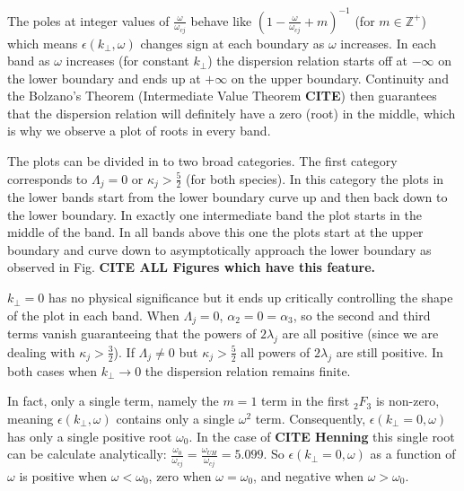 \documentclass[12pt,a4paper]{article}
\begin{document}
    The poles at integer values of $\frac{\omega}{\omega_{cj}}$ behave like $(1 - \frac{\omega}{\omega_{cj}} + m)^{-1}$ (for $m \in \mathbb{Z}^+$) which means $\epsilon(k_\perp, \omega)$ changes sign at each boundary as $\omega$ increases.
    In each band as $\omega$ increases (for constant $k_\perp$) the dispersion relation starts off at $-\infty$ on the lower boundary and ends up at $+\infty$ on the upper boundary.
    Continuity and the Bolzano's Theorem (Intermediate Value Theorem \textbf{CITE}) then guarantees that the dispersion relation will definitely have a zero (root) in the middle, which is why we observe a plot of roots in every band.

    The plots can be divided in to two broad categories.
    The first category corresponds to $\Lambda_j = 0$ or $\kappa_j > \frac{5}{2}$ (for both species).
    In this category the plots in the lower bands start from the lower boundary curve up and then back down to the lower boundary.
    In exactly one intermediate band the plot starts in the middle of the band.
    In all bands above this one the plots start at the upper boundary and curve down to asymptotically approach the lower boundary as observed in Fig. \textbf{CITE ALL Figures which have this feature.}

    $k_\perp = 0$ has no physical significance but it ends up critically controlling the shape of the plot in each band.
    When $\Lambda_j = 0$, $\alpha_2 = 0 = \alpha_3$, so the second and third terms vanish guaranteeing that the powers of $2 \lambda_j$ are all positive (since we are dealing with $\kappa_j > \frac{3}{2}$).
    If $\Lambda_j \neq 0$ but $\kappa_j > \frac{5}{2}$ all powers of $2 \lambda_j$ are still positive.
    In both cases when $k_\perp \rightarrow 0$ the dispersion relation remains finite.

    In fact, only a single term, namely the $m = 1$ term in the first $_2F_3$ is non-zero, meaning $\epsilon(k_\perp, \omega)$ contains only a single $\omega^2$ term.
    Consequently, $\epsilon(k_\perp = 0, \omega)$ has only a single positive root $\omega_0$.
    In the case of \textbf{CITE Henning} this single root can be calculate analytically: $\frac{\omega_0}{\omega_{cj}} = \frac{\omega_{UH}}{\omega_{cj}} = 5.099$.
    So $\epsilon(k_\perp = 0, \omega)$ as a function of $\omega$ is positive when $\omega < \omega_0$, zero when $\omega = \omega_0$, and negative when $\omega > \omega_0$.
\end{document}
